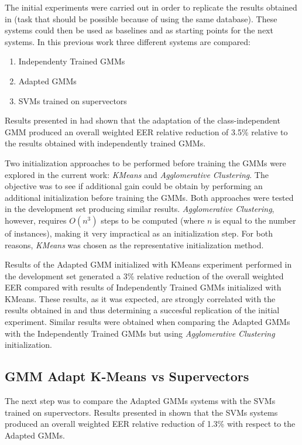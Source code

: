 The initial experiments were carried out in order to replicate the results obtained in \cite{main} (task that should be possible because of using the same database).
These systems could then be used as baselines and as starting points for the next systems.
In this previous work three different systems are compared:

\begin{enumerate}
	\item Independenty Trained GMMs
	\item Adapted GMMs
	\item SVMs trained on supervectors
\end{enumerate}

Results presented in \cite{main} had shown that the adaptation of the class-independent GMM produced
an overall weighted EER relative reduction of 3.5\% relative to the results
obtained with independently trained GMMs.

Two initialization approaches to be performed before training the GMMs
were explored in the current work: \textit{KMeans} and \textit{Agglomerative Clustering}. The
objective was to see if additional gain could be obtain by performing an additional initialization
before training the GMMs. Both approaches were tested in the development set producing similar
results. \textit{Agglomerative Clustering}, however, requires $O(n^{3})$ steps to be computed
(where $n$ is equal to the number of instances), making it very impractical as an initialization
step. For both reasons, \textit{KMeans} was chosen as the representative initialization method.

Results of the Adapted GMM initialized with KMeans experiment performed in the development set
generated a 3\% relative reduction of the overall weighted EER compared with results of
Independently Trained GMMs initialized with KMeans.
These results, as it was
expected, are strongly correlated with the results obtained in \cite{main} and
thus determining a succesful replication of the initial experiment. Similar results were obtained
when comparing the Adapted GMMs with the Independently Trained GMMs but using
\textit{Agglomerative Clustering} initialization.

\subsection{GMM Adapt K-Means vs Supervectors}

The next step was to compare the Adapted GMMs systems with the SVMs trained on supervectors.
Results presented in \cite{main} shown that the SVMs systems produced an overall weighted EER
relative reduction of 1.3\% with respect to the Adapted GMMs.

